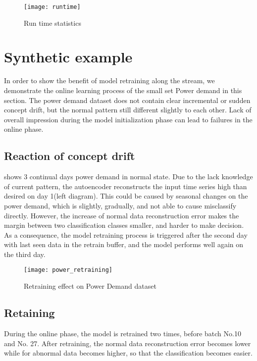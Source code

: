 \begin{figure}[h]
\centering
\texttt{[image: runtime]}
\caption[Run time statistics]{Run time statistics}
\label{fig:runtime}
\end{figure}


\section{Synthetic example}
\label{sec:synthetic}

In order to show the benefit of model retraining along the stream, we demonstrate the online learning process of the small set Power demand in this section. The power demand dataset does not contain clear incremental or sudden concept drift, but the normal pattern still different slightly to each other. Lack of overall impression during the model initialization phase can lead to failures in the online phase. 

\subsection{Reaction of concept drift}
\label{sec:reaction}

 shows 3 continual days power demand in normal state. Due to the lack knowledge of current pattern, the autoencoder reconstructs the input time series high than desired on day 1(left diagram). This could be caused by seasonal changes on the power demand, which is slightly, gradually, and not able to cause misclassify directly. However, the increase of normal data reconstruction error makes the margin between two classification classes smaller, and harder to make decision. As a consequence, the model retraining process is triggered after the second day with last seen data in the retrain buffer, and the model performs well again on the third day.

\begin{figure}[h]
\centering
\texttt{[image: power\_retraining]}
\caption[Retraining effect on Power Demand dataset]{Retraining effect on Power Demand dataset}
\label{fig:power_retraining}
\end{figure}

\subsection{Retaining}
\label{sec:retrainig}

During the online phase, the model is retrained two times, before batch No.10 and No. 27. After retraining, the normal data reconstruction error becomes lower while for abnormal data becomes higher, so that the classification becomes easier.

